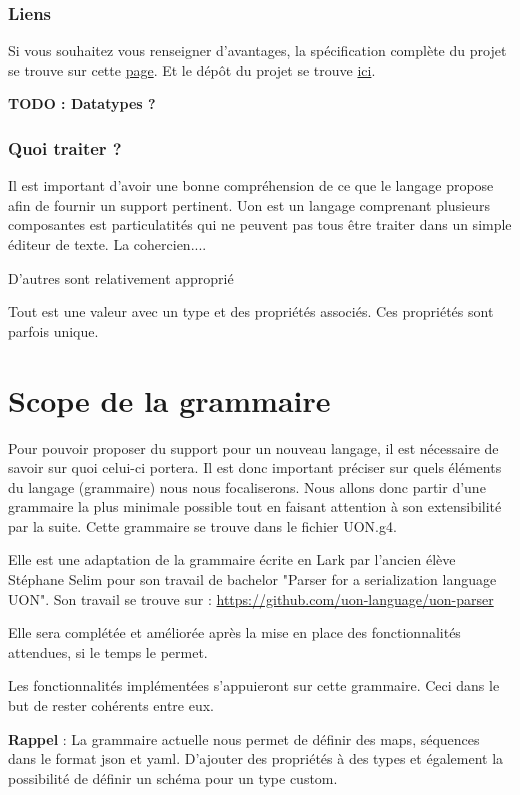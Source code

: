\documentclass[
    iict, %
    il, %
]{heig-tb}
\begin{document}
\subsection{Liens}
Si vous souhaitez vous renseigner d'avantages, la spécification complète du projet se trouve sur cette \href{https://github.com/uon-language/specification/}{page}.
Et le dépôt du projet se trouve \href{https://github.com/uon-language/specification}{ici}.

\textbf{TODO : Datatypes ?}

\subsection{Quoi traiter ?}
Il est important d'avoir une bonne compréhension de ce que le langage propose afin de fournir un support pertinent.
Uon est un langage comprenant plusieurs composantes est particulatités qui ne peuvent pas tous être traiter dans un simple éditeur de texte.
La cohercien....

D'autres sont relativement approprié

Tout est une valeur avec un type et des propriétés associés. Ces propriétés sont parfois unique.


\chapter{Scope de la grammaire}\label{grammar scope}
Pour pouvoir proposer du support pour un nouveau langage, il est nécessaire de savoir sur quoi celui-ci portera. Il est donc important préciser sur quels éléments du langage (grammaire) nous nous focaliserons.
Nous allons donc partir d'une grammaire la plus minimale possible tout en faisant attention à son extensibilité par la suite.
Cette grammaire se trouve dans le fichier UON.g4.

Elle est une adaptation de la grammaire écrite en Lark par l'ancien élève Stéphane Selim pour son travail de bachelor "Parser for a serialization language UON". Son travail se trouve sur :
\href{https://github.com/uon-language/uon-parser}{https://github.com/uon-language/uon-parser}

Elle sera complétée et améliorée après la mise en place des fonctionnalités attendues, si le temps le permet.

Les fonctionnalités implémentées s'appuieront sur cette grammaire. Ceci dans le but de rester cohérents entre eux.

\textbf{Rappel} :
La grammaire actuelle nous permet de définir des maps, séquences dans le format json et yaml. D'ajouter des propriétés à des types et également la possibilité de définir un schéma pour un type custom.
\end{document}
